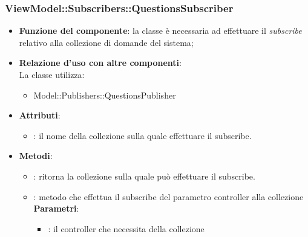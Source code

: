 \subsubsection{ViewModel::Subscribers::QuestionsSubscriber}
\begin{itemize}
\item\textbf{Funzione del componente}: la classe è necessaria ad effettuare il \emph{subscribe} relativo alla collezione di domande del sistema;
	\item\textbf{Relazione d'uso con altre componenti}: \\
La classe utilizza:
	\begin{itemize}
		\item Model::Publishers::QuestionsPublisher	
	\end{itemize}
\item\textbf{Attributi}:
	\begin{itemize}
		\item{}: il nome della collezione sulla quale effettuare il subscribe.\\	
	\end{itemize}
\item\textbf{Metodi}:
	\begin{itemize}
		\item{}: ritorna la collezione sulla quale può effettuare il subscribe.\\
		\item{}: metodo che effettua il subscribe del parametro controller alla collezione\\
		\textbf{Parametri}:
			\begin{itemize}
				\item{}: il controller che necessita della collezione\\
			\end{itemize}
	\end{itemize}
\end{itemize}

